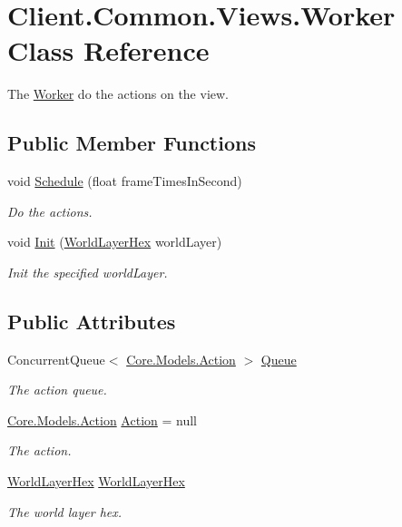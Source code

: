 \hypertarget{classClient_1_1Common_1_1Views_1_1Worker}{}\section{Client.\+Common.\+Views.\+Worker Class Reference}
\label{classClient_1_1Common_1_1Views_1_1Worker}


The \hyperlink{classClient_1_1Common_1_1Views_1_1Worker}{Worker} do the actions on the view.  


\subsection*{Public Member Functions}
\begin{DoxyCompactItemize}
\item 
void \hyperlink{classClient_1_1Common_1_1Views_1_1Worker_a2d11d9c1897409b49838113d58621940}{Schedule} (float frame\+Times\+In\+Second)
\begin{DoxyCompactList}\small\item\em Do the actions. \end{DoxyCompactList}\item 
void \hyperlink{classClient_1_1Common_1_1Views_1_1Worker_aff74f2e82c8172f6eb0ca36103d9e0b9}{Init} (\hyperlink{classClient_1_1Common_1_1Views_1_1WorldLayerHex}{World\+Layer\+Hex} world\+Layer)
\begin{DoxyCompactList}\small\item\em Init the specified world\+Layer. \end{DoxyCompactList}\end{DoxyCompactItemize}
\subsection*{Public Attributes}
\begin{DoxyCompactItemize}
\item 
Concurrent\+Queue$<$ \hyperlink{classCore_1_1Models_1_1Action}{Core.\+Models.\+Action} $>$ \hyperlink{classClient_1_1Common_1_1Views_1_1Worker_a0994155b4af488be620e43884074ef3d}{Queue}
\begin{DoxyCompactList}\small\item\em The action queue. \end{DoxyCompactList}\item 
\hyperlink{classCore_1_1Models_1_1Action}{Core.\+Models.\+Action} \hyperlink{classClient_1_1Common_1_1Views_1_1Worker_a2363fe6b4fc0e8978dc53fb9bce676e1}{Action} = null
\begin{DoxyCompactList}\small\item\em The action. \end{DoxyCompactList}\item 
\hyperlink{classClient_1_1Common_1_1Views_1_1WorldLayerHex}{World\+Layer\+Hex} \hyperlink{classClient_1_1Common_1_1Views_1_1Worker_ad93fe39b0876e5f1d7673e657364740d}{World\+Layer\+Hex}
\begin{DoxyCompactList}\small\item\em The world layer hex. \end{DoxyCompactList}\end{DoxyCompactItemize}
